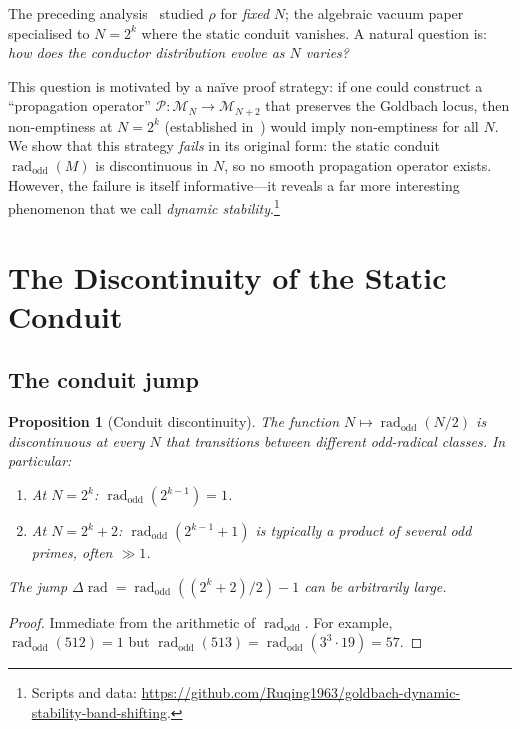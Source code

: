 \documentclass[11pt,a4paper]{article}
\newtheorem{proposition}[theorem]{Proposition}
\theoremstyle{definition}
\DeclareMathOperator{\rad}{rad}
\begin{document}
The preceding analysis~\cite{Chen2026GMII} studied $\rho$ for \emph{fixed} $N$;
the algebraic vacuum paper~\cite{Chen2026AV} specialised to $N = 2^k$ where the
static conduit vanishes.  A natural question is: \emph{how does the conductor
distribution evolve as $N$ varies?}

This question is motivated by a na\"ive proof strategy: if one could construct a
``propagation operator'' $\mathcal{P}: \mathcal{M}_N \to \mathcal{M}_{N+2}$ that
preserves the Goldbach locus, then non-emptiness at $N = 2^k$ (established
in~\cite{Chen2026AV}) would imply non-emptiness for all $N$.  We show that this
strategy \emph{fails} in its original form: the static conduit
$\rad_{\mathrm{odd}}(M)$ is discontinuous in $N$, so no smooth propagation
operator exists.  However, the failure is itself informative---it reveals a
far more interesting phenomenon that we call \emph{dynamic stability}.\footnote{Scripts
and data:
\url{https://github.com/Ruqing1963/goldbach-dynamic-stability-band-shifting}.}


\section{The Discontinuity of the Static Conduit}\label{sec:discontinuity}

\subsection{The conduit jump}

\begin{proposition}[Conduit discontinuity]\label{prop:jump}
  The function $N \mapsto \rad_{\mathrm{odd}}(N/2)$ is discontinuous at every
  $N$ that transitions between different odd-radical classes.  In particular:
  \begin{enumerate}
  \item At $N = 2^k$: $\rad_{\mathrm{odd}}(2^{k-1}) = 1$.
  \item At $N = 2^k + 2$: $\rad_{\mathrm{odd}}(2^{k-1} + 1)$ is typically
    a product of several odd primes, often $\gg 1$.
  \end{enumerate}
  The jump $\Delta\!\rad = \rad_{\mathrm{odd}}((2^k+2)/2) - 1$ can be arbitrarily
  large.
\end{proposition}

\begin{proof}
  Immediate from the arithmetic of $\rad_{\mathrm{odd}}$.  For example,
  $\rad_{\mathrm{odd}}(512) = 1$ but $\rad_{\mathrm{odd}}(513) = \rad_{\mathrm{odd}}(3^3 \cdot 19) = 57$.
\end{proof}
\end{document}
